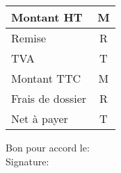 \documentclass{article}
\begin{document}
\begin{flushright}
\begin{tabular}{|p{4cm} c|}
\hline
Montant HT & M \\
\hline
Remise & R \\
\hline
TVA & T \\
\hline
Montant TTC & M \\
\hline
Frais de dossier & R \\
\hline
Net à payer & T \\
\hline
\end{tabular}
\end{flushright}

\vspace{1cm}
\begin{flushleft}
Bon pour accord le:
\\Signature:
\end{flushleft}
\end{document}
